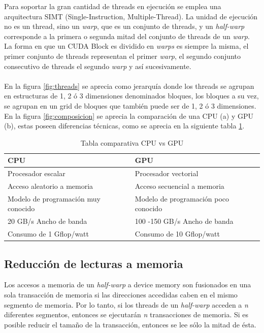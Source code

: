 Para soportar la gran cantidad de threads en ejecución se emplea una arquitectura SIMT (Single-Instruction, Multiple-Thread). La unidad de ejecución no es un thread, sino un \textit{warp}, que es un conjunto de threads, y un \textit{half-warp} corresponde a la primera o segunda mitad del conjunto de threads de un \textit{warp}. La forma en que un CUDA Block es dividido en \textit{warps} es siempre la misma, el primer conjunto de threads representan el primer \textit{warp}, el segundo conjunto consecutivo de threads el segundo \textit{warp} y así sucesivamente.\\\\

En la figura \ref{fig:threads} se aprecia como jerarquía donde los threads se agrupan en estructuras de 1, 2 ó 3 dimensiones denominados bloques, los bloques a su vez, se agrupan en un grid de bloques que también puede ser de 1, 2 ó 3 dimensiones.\\
En la figura \ref{fig:composicion} se aprecia la comparación de una CPU (a) y GPU (b), estas poseen diferencias técnicas, como se aprecia en la siguiente tabla \ref{tabla_gpu}.\\
\begin{table}
	\begin{center} 
   	\caption{\label{tabla_gpu} Tabla comparativa CPU vs GPU}
	\begin{tabular}{|l|l|}
	\hline 
	\textbf{CPU} & \textbf{GPU} \\ 
	\hline 
	Procesador escalar & Procesador vectorial \\ 
	Acceso aleatorio a memoria & Acceso secuencial a memoria \\  
	Modelo de programación muy conocido & Modelo de programación poco conocido \\  
	20 GB/s Ancho de banda & 100 -150 GB/s Ancho de banda \\  
	Consumo de 1 Gflop/watt & Consumo de 10 Gflop/watt \\ 
	\hline 
	\end{tabular} 
\end{center}
\end{table}

\subsection*{Reducción de lecturas a memoria}

Los accesos a memoria de un \textit{half-warp} a device memory son fusionados en una sola transacción de memoria si las direcciones accedidas caben en el mismo segmento de memoria. Por lo tanto, si los threads de un \textit{half-warp} acceden a \textit{n} diferentes segmentos, entonces se ejecutarán \textit{n} transacciones de memoria. Si es posible reducir el tamaño de la transacción, entonces se lee sólo la mitad de ésta.

